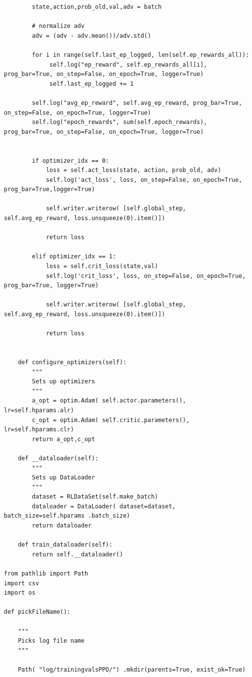 \documentclass[12pt]{article}
\begin{document}
\begin{addmargin}[-4em]{-4em}
\begin{multicols}{2}
\begin{verbatim}
        state,action,prob_old,val,adv = batch

        # normalize adv
        adv = (adv - adv.mean())/adv.std()
        
        for i in range(self.last_ep_logged, len(self.ep_rewards_all)):
             self.log("ep_reward", self.ep_rewards_all[i], prog_bar=True, on_step=False, on_epoch=True, logger=True)
             self.last_ep_logged += 1

        self.log("avg_ep_reward", self.avg_ep_reward, prog_bar=True, on_step=False, on_epoch=True, logger=True)
        self.log("epoch_rewards", sum(self.epoch_rewards), prog_bar=True, on_step=False, on_epoch=True, logger=True)

        
        if optimizer_idx == 0:
            loss = self.act_loss(state, action, prob_old, adv)
            self.log('act_loss', loss, on_step=False, on_epoch=True, prog_bar=True,logger=True)

            self.writer.writerow( [self.global_step, self.avg_ep_reward, loss.unsqueeze(0).item()])

            return loss

        elif optimizer_idx == 1:
            loss = self.crit_loss(state,val)
            self.log('crit_loss', loss, on_step=False, on_epoch=True, prog_bar=True, logger=True)

            self.writer.writerow( [self.global_step, self.avg_ep_reward, loss.unsqueeze(0).item()])

            return loss

    
    def configure_optimizers(self):
        """
        Sets up optimizers
        """
        a_opt = optim.Adam( self.actor.parameters(), lr=self.hparams.alr)
        c_opt = optim.Adam( self.critic.parameters(), lr=self.hparams.clr)
        return a_opt,c_opt
    
    def __dataloader(self):
        """
        Sets up DataLoader 
        """
        dataset = RLDataSet(self.make_batch)
        dataloader = DataLoader( dataset=dataset, batch_size=self.hparams .batch_size)
        return dataloader
    
    def train_dataloader(self):
        return self.__dataloader()

from pathlib import Path
import csv
import os

def pickFileName():

    """
    Picks log file name
    """

    Path( "log/trainingvalsPPO/") .mkdir(parents=True, exist_ok=True)


\end{verbatim}
\end{multicols}
\end{addmargin}
\end{document}
